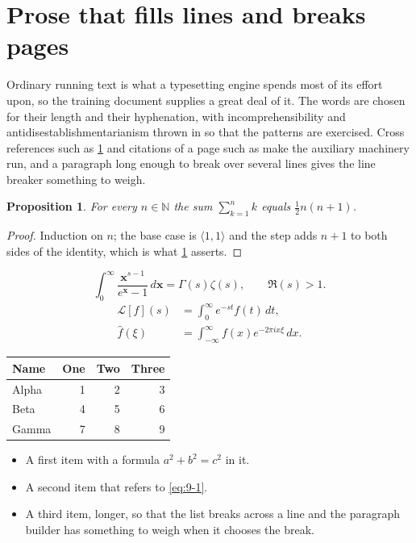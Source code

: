 \documentclass[11pt,a4paper]{report}
\theoremstyle{plain}
\newtheorem{proposition}{Proposition}[chapter]
\newcommand{\vecn}[1]{\mathbf{#1}}
\newcommand{\pairs}[2]{\langle #1,#2\rangle}
\begin{document}
\section{Prose that fills lines and breaks pages}
\label{sec:prose9-1}
Ordinary running text is what a typesetting engine spends most of its effort
upon, so the training document supplies a great deal of it. The words are
chosen for their length and their hyphenation, with incomprehensibility and
antidisestablishmentarianism thrown in so that the patterns are exercised.
Cross references such as \cref{sec:prose9-1} and citations of a page such
as \pageref{sec:prose9-1} make the auxiliary machinery run, and a
paragraph long enough to break over several lines gives the line breaker
something to weigh.
\begin{proposition}\label{prop:9-1}
For every $n\in\mathbb{N}$ the sum $\sum_{k=1}^{n}k$ equals
$\tfrac{1}{2}n(n+1)$.
\end{proposition}
\begin{proof}
Induction on $n$; the base case is $\pairs{1}{1}$ and the step adds $n+1$ to
both sides of the identity, which is what \cref{prop:9-1} asserts.
\end{proof}
\begin{equation}\label{eq:9-1}
  \int_{0}^{\infty}\frac{\vecn{x}^{s-1}}{e^{\vecn{x}}-1}\,d\vecn{x}
    = \Gamma(s)\zeta(s),\qquad \Re(s)>1 .
\end{equation}
\begin{align}
  \mathcal{L}[f](s) &= \int_{0}^{\infty} e^{-st} f(t)\,dt, \\
  \widehat{f}(\xi)  &= \int_{-\infty}^{\infty} f(x) e^{-2\pi i x\xi}\,dx .
\end{align}
\par\noindent\begin{center}
\begin{tabular}{lrrr}
\hline
Name & One & Two & Three \\
\hline
Alpha & 1 & 2 & 3 \\
Beta & 4 & 5 & 6 \\
Gamma & 7 & 8 & 9 \\
\hline
\end{tabular}
\end{center}
\begin{itemize}
  \item A first item with a formula $a^2+b^2=c^2$ in it.
  \item A second item that refers to \eqref{eq:9-1}.
  \item A third item, longer, so that the list breaks across a line and the
    paragraph builder has something to weigh when it chooses the break.
\end{itemize}
\end{document}
